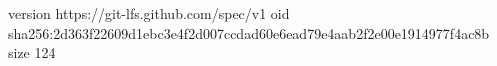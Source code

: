 version https://git-lfs.github.com/spec/v1
oid sha256:2d363f22609d1ebc3e4f2d007ccdad60e6ead79e4aab2f2e00e1914977f4ac8b
size 124
